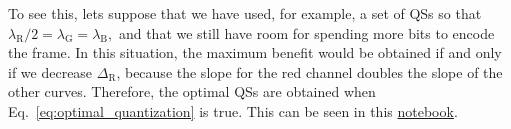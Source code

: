 To see this, lets suppose that we have used, for example, a set of QSs
so that $\lambda_{\text{R}}/2 = \lambda_{\text{G}}
= \lambda_{\text{B}},$ and that we still have room for spending more
bits to encode the frame. In this situation, the maximum benefit would
be obtained if and only if we decrease $\Delta_{\text{R}}$, because
the slope for the red channel doubles the slope of the other
curves. Therefore, the optimal QSs are obtained when
Eq.~\ref{eq:optimal_quantization} is true. This can be seen in
this \href{https://github.com/Sistemas-Multimedia/Sistemas-Multimedia.github.io/blob/master/milestones/05-RGB_quantization/RGB_quantization.ipynb}{notebook}.

\begin{comment}
Thus, the optimal QSs should
operate in the curves with the same RD slope,
\begin{equation}
  \lambda_{\text{R}} = \lambda_{\text{G}} = \lambda_{\text{B}},
  \label{eq:optimal_quantization}
\end{equation}
for a given total bit-rate $R$, which implies that the contribution of each channel (the ratio between
quality and bit-rate) to the quality of $\tilde{x}$ has been highest
possible~\cite{vetterli1995wavelets,sayood2017introduction}.

Unfortunately, the previous procedure implies the computation of the
RD curve for each channel, which is a time-consuming operation. For
this reason, and supposing that the statistics of each channel are
similar and therefore, each channel is going to generate a RD curve
with the same slopes for the same QSs, we can suppose that
Eq.~\ref{eq:simple_Q} satisfies Eq.~\ref{eq:optimal_quantization}.
\end{comment}

